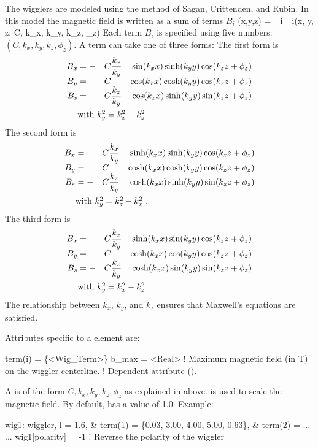 {The  wigglers are modeled using the method of Sagan,
Crittenden, and Rubin\cite{b:wiggler}. In this model the magnetic
field is written as a sum of terms $B_i$
\Begineq
  \bfB(x,y,z) = \sum_i \bfB_i(x, y, z; C, k_x, k_y, k_z, \phi_z)
\Endeq 
Each term $B_i$ is specified using five numbers: 
$(C, k_x, k_y, k_z, \phi_z)$. A term can take one of three forms: The first
form is
\begin{alignat}{4}
  B_x &= -&C &\dfrac{k_x}{k_y} & \sin(\kxx) \sinh(\kyy) \cos(\kzzz) \CRNEG
  B_y &=  &C &                 & \cos(\kxx) \cosh(\kyy) \cos(\kzzz) \CRNEG
  B_s &= -&C &\dfrac{k_z}{k_y} & \cos(\kxx) \sinh(\kyy) \sin(\kzzz) \label{f1} \\
  & \makebox[1pt][l]{with $k_y^2 = k_x^2 + k_z^2$ .} &&&  \nonumber
\end{alignat}
The second form is
\begin{alignat}{4}
  B_x &=  &C &\dfrac{k_x}{k_y} & \sinh(\kxx) \sinh(\kyy) \cos(\kzzz) \CRNEG
  B_y &=  &C &                 & \cosh(\kxx) \cosh(\kyy) \cos(\kzzz) \CRNEG
  B_s &= -&C &\dfrac{k_z}{k_y} & \cosh(\kxx) \sinh(\kyy) \sin(\kzzz) \label{f2} \\
  & \makebox[1pt][l]{with $k_y^2 = k_z^2 - k_x^2$ ,} &&&  \nonumber
\end{alignat}
The third form is
\begin{alignat}{4}
  B_x &=  &C &\dfrac{k_x}{k_y} & \sinh(\kxx) \sin(\kyy) \cos(\kzzz) \CRNEG
  B_y &=  &C &                 & \cosh(\kxx) \cos(\kyy) \cos(\kzzz) \CRNEG
  B_s &= -&C &\dfrac{k_z}{k_y} & \cosh(\kxx) \sin(\kyy) \sin(\kzzz) \label{f3} \\
  & \makebox[1pt][l]{with $k_y^2 = k_x^2 - k_z^2$ .} &&& \nonumber
\end{alignat}
The relationship between $k_x$, $k_y$, and $k_z$ ensures that
Maxwell's equations are satisfied.

Attributes specific to a   element are:
\begin{example}
  term(i)  = \{<Wig_Term>\} 
  b_max    = <Real>   ! Maximum magnetic field (in T) on the wiggler centerline. 
                      !   Dependent attribute ().
\end{example}

A  is of the form $C, k_x, k_y, k_z, \phi_z$ as
explained in above.  is used to scale the
magnetic field. By default,  has a value of 1.0. 
Example:
\begin{example}
  wig1: wiggler, l = 1.6, \&
          term(1) = \{0.03, 3.00, 4.00, 5.00, 0.63\}, \&
          term(2) = ...
  ...
  wig1[polarity] = -1  ! Reverse the polarity of the wiggler
\end{example}

}
